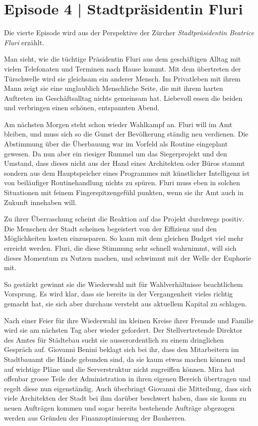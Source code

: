 \documentclass[11pt,a4paper,ngerman]{scrreprt}
\begin{document}
\section*{Episode 4 | Stadtpräsidentin Fluri}

Die vierte Episode wird aus der Perspektive der Zürcher \emph{Stadtpräsidentin
Beatrice Fluri} erzählt.

Man sieht, wie die tüchtige Präsidentin Fluri aus dem geschäftigen Alltag mit
vielen Telefonaten und Terminen nach Hause kommt. Mit dem übertreten der
Türschwelle wird sie gleichsam ein anderer Mensch. Im Privatleben mit ihrem Mann
zeigt sie eine unglaublich Menschliche Seite, die mit ihrem harten Auftreten im
Geschäftsalltag nichts gemeinsam hat. Liebevoll essen die beiden und verbringen
einen schönen, entspannten Abend.

Am nächsten Morgen steht schon wieder Wahlkampf an. Fluri will im Amt
bleiben, und muss sich so die Gunst der Bevölkerung ständig neu verdienen. Die
Abstimmung über die Überbauung war im Vorfeld als Routine eingeplant gewesen. Da
nun aber ein riesiger Rummel um das Siegerprojekt und den Umstand, dass dieses
nicht aus der Hand eines Architekten oder Büros stammt sondern aus dem
Hauptspeicher eines Programmes mit künstlicher Intelligenz ist von beiläufiger
Routinehandlung nichts zu spüren. Fluri muss eben in solchen Situationen mit
feinem Fingerspitzengefühl punkten, wenn sie ihr Amt auch in Zukunft innehaben
will.

Zu ihrer Überraschung scheint die Reaktion auf das Projekt durchwegs
positiv. Die Menschen der Stadt scheinen begeistert von der Effizienz und den
Möglichkeiten kosten einzusparen. So kann mit dem gleichen Budget viel mehr
erreicht werden. Fluri, die diese Stimmung sehr schnell wahrnimmt, will sich
dieses Momentum zu Nutzen machen, und schwimmt mit der Welle der Euphorie mit.

So gestärkt gewinnt sie die Wiederwahl mit für Wahlverhältnisse beachtlichem
Vorsprung. Es wird klar, dass sie bereits in der Vergangenheit vieles richtig
gemacht hat, sie sich aber durchaus versteht aus aktuellem Kapital zu schlagen.

Nach einer Feier für ihre Wiederwahl im kleinen Kreise ihrer Freunde und Familie
wird sie am nächsten Tag aber wieder gefordert. Der Stellvertretende Direktor
des Amtes für Städtebau sucht sie ausserordentlich zu einem dringlichen Gespräch
auf. Giovanni Benini beklagt sich bei ihr, dass den Mitarbeitern im Stadtbauamt
die Hände gebunden sind, da sie kaum etwas machen können und auf wichtige Pläne
und die Serverstruktur nicht zugreiffen können. Mira hat offenbar grosse Teile
der Administration in ihren eigenen Bereich übertragen und regelt diese nun
eigenständig. Auch überbringt Giovanni die Mitteilung, dass sich viele
Architekten der Stadt bei ihm darüber beschwert haben, dass sie kaum zu neuen
Aufträgen kommen und sogar bereits bestehende Aufträge abgezogen werden aus
Gründen der Finanzoptimierung der Bauherren.
\end{document}
